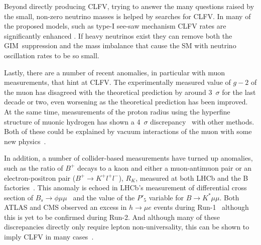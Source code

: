 Beyond directly producing \ac{CLFV}, trying to answer the many questions raised by the small, non-zero neutrino masses is helped by searches for \ac{CLFV}.
In many of the proposed models, such as type-I see-saw mechanism \ac{CLFV} rates are significantly enhanced .
If heavy neutrinos exist they can remove both the GIM~suppression and the mass imbalance that cause the \ac{SM} with neutrino oscillation rates to be so small.

Lastly, there are a number of recent anomalies, in particular with muon measurements, that hint at \ac{CLFV}.
The experimentally measured value of $g-2$ of the muon has disagreed with the theoretical prediction by around 3~$\sigma$ for the last decade or two, even worsening as the theoretical prediction has been improved.
At the same time, measurements of the proton radius using the hyperfine structure of muonic hydrogen has shown a 4~$\sigma$ discrepancy~\cite{} with other methods.
Both of these could be explained by vacuum interactions of the muon with some new physics~\cite{}.

In addition, a number of collider-based measurements have turned up anomalies, such as the ratio of $B^+$ decays to a kaon and either a muon-antimuon pair or an electron-positron pair ($B^+\rightarrow K^+l^+l^-$), $R_K$, measured at both LHCb and the B factories~\cite{}.
This anomaly is echoed in LHCb's measurement of differential cross section of $B_s\rightarrow\phi\mu\mu$~\cite{} and the value of the $P'_5$ variable for $B\rightarrow K^*\mu\mu$.
Both ATLAS and CMS observed an excess in $h\rightarrow\mu e$ events during Run-1~\cite{} although this is yet to be confirmed during Run-2.
And although many of these discrepancies directly only require lepton non-universality, this can be shown to imply \ac{CLFV} in many cases~\cite{}.


